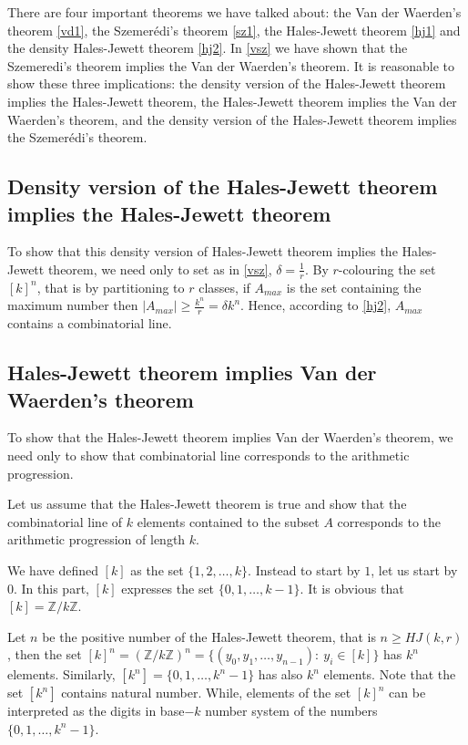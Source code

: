 There are four important theorems we have talked about: the Van der Waerden's theorem \eqref{vd1}, the Szemerédi's theorem \eqref{sz1}, the  Hales-Jewett theorem \eqref{hj1} and the density Hales-Jewett theorem \eqref{hj2}. 
In \eqref{vsz} we have shown that the Szemeredi's theorem implies the Van der Waerden's theorem. It is reasonable to show these three implications: the density version of the Hales-Jewett theorem implies the Hales-Jewett theorem, the Hales-Jewett theorem implies the  Van der Waerden's theorem, and the density version of the Hales-Jewett theorem implies the Szemerédi's theorem.

\subsection{Density version of the Hales-Jewett theorem implies the Hales-Jewett theorem}

To show that this density version of Hales-Jewett theorem implies the Hales-Jewett theorem, we need only to set as in  \eqref{vsz}, $\delta=\frac{1}{r}.$ By $r$-colouring the set $[k]^n$, that is by partitioning to $r$ classes,  if $A_{max}$ is the set containing the maximum number then $|A_{max}| \geq \frac{k^n}{r}=\delta k^n.$ Hence, according to \eqref{hj2}, $A_{max}$ contains a combinatorial line.

\subsection{Hales-Jewett theorem implies Van der Waerden's theorem}

To show that the Hales-Jewett theorem implies Van der Waerden's theorem, we need only to show that combinatorial line corresponds to the arithmetic progression.

Let us  assume that the Hales-Jewett theorem is true and show that the combinatorial line of $k$ elements contained to the subset $A$ corresponds to the arithmetic progression of length $k$.

We have defined $[k]$ as the set $\{1,2,\ldots, k\}.$ Instead to start by $1$, let us start by $0.$ In this part, $[k]$ expresses the set $\{0,1,\ldots, k-1\}.$ It is obvious that $[k]=\mathbb{Z}/k\mathbb{Z}.$

Let $n$ be the positive number of the Hales-Jewett theorem, that is $n\geq HJ(k,r)$, then the set $[k]^n=(\mathbb{Z}/k\mathbb{Z})^n=\{(y_0,y_1, \ldots, y_{n-1}): \ y_i \in [k] \}$ has $k^n$ elements. Similarly, $[k^n]=\{0,1,\ldots, k^n-1\}$ has also $k^n$ elements. Note that the set $[k^n]$ contains natural number.
While, elements of the set $[k]^n$ can be interpreted as 
the digits  in base$-k$ number system of the numbers $\{0,1,\ldots,k^n-1\}.$

